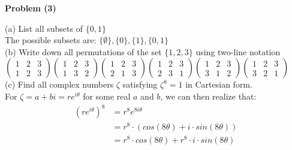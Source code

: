 \documentclass[20pt]{article}
\begin{document}
\noindent
\textbf{Problem (3)}\\
\begin{text}
    (a) List all subsets of $\{0, 1\}$\\
    The possible subsets are: $\{\emptyset\}, \{0\}, \{1\}, \{0,1\}$\\
    
    \noindent
    (b) Write down all permutations of the set $\{1,2,3\}$ using two-line notation\\
    
    $\begin{pmatrix}
        1 & 2 & 3\\
        1 & 2 & 3
    \end{pmatrix}
    \begin{pmatrix}
        1 & 2 & 3\\
        1 & 3 & 2
    \end{pmatrix}
    \begin{pmatrix}
        1 & 2 & 3\\
        2 & 1 & 3
    \end{pmatrix}
    \begin{pmatrix}
        1 & 2 & 3\\
        2 & 3 & 1
    \end{pmatrix}
    \begin{pmatrix}
        1 & 2 & 3\\
        3 & 1 & 2
    \end{pmatrix}
    \begin{pmatrix}
        1 & 2 & 3\\
        3 & 2 & 1
    \end{pmatrix}$\\
    
    \noindent
    (c) Find all complex numbers $\zeta$ satisfying $\zeta^8 = 1$ in Cartesian form.\\
    
    \noindent
    For $\zeta = a + bi = re^{i\theta}$ for some real $a$ and $b$, we can then realize that:\\
    
    \begin{align}
        (re^{i\theta})^8 &= r^{8}e^{8i\theta}\nonumber\\
        &= r^{8} \cdot (cos(8\theta) + i\cdot sin(8\theta))\nonumber\\
        &= r^{8} \cdot cos(8\theta) + r^{8} \cdot i \cdot sin(8\theta)\nonumber
    \end{align}
    

\end{text}
\end{document}
